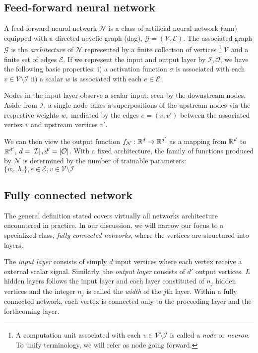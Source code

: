 \subsection{Feed-forward neural network}

A feed-forward neural network $\mathcal{N}$ is a class of artificial neural
network (\gls{ann}) equipped with a directed acyclic graph (\gls{dag}), 
$\mathcal{G} = (\mathcal{V}, \mathcal{E})$. The associated graph $\mathcal{G}$
is the \textit{architecture} of $\mathcal{N}$ represented by a finite collection
of vertices \footnote{
    A computation unit associated with each $v \in \mathcal{V} \setminus \mathcal{I}$
    is called a \textit{node} or \textit{neuron}. To unify terminology, we will 
    refer as node going forward.
}
$\mathcal{V}$ and a finite set of edges $\mathcal{E}$. If we
represent the input and output layer by $\mathcal{I, O}$, we have the following
basic properties: 
i) a activation function $\sigma$ is associated with each 
$v \in \mathcal{V} \setminus \mathcal{I}$ 
ii) a scalar $w$ is associated with each $e \in \mathcal{E}$.

Nodes in the input layer observe a scalar input, seen by the downstream nodes.
Aside from $\mathcal{I}$, a single node takes a superpositions of the upstream
nodes via the respective weights $w_e$ mediated by the edges $e = (v, v')$
between the associated vertex $v$ and upstream vertices $v'$. 

We can then view the output function $f_{\mathcal{N}}: \mathbb{R}^d \to \mathbb{R}^{d'}$ as a
mapping from $\mathbb{R}^d$ to $\mathbb{R}^{d'}$, $d = \left| \mathcal{I} \right|, d' =
\left| \mathcal{O} \right|$. With a fixed architecture, the family of functions produced
by $\mathcal{N}$ is determined by the number of trainable parameters: $\{w_e,
b_v\}, e \in \mathcal{E}, v \in \mathcal{V} \setminus \mathcal{I}$

\subsection{Fully connected network}

The general definition stated covers virtually all networks architecture
encountered in practice. In our discussion, we will narrow our focus to a
specialized class, \textit{fully connected networks}, where the vertices are
structured into layers.

The \textit{input layer} consists of simply $d$ input vertices where each vertex
receive a external scalar signal. Similarly, the \textit{output layer} consists
of $d'$ output vertices. $L$ hidden layers follows the input layer and each
layer constituted of $n_j$ hidden vertices and the integer $n_j$ is called the
\textit{width} of the $j$th layer. Within a fully connected network, each vertex
is connected only to the proceeding layer and the forthcoming layer.

